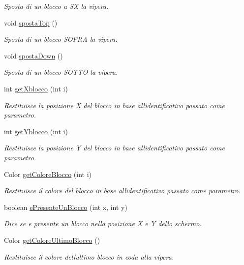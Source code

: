 \begin{DoxyCompactItemize}
\begin{DoxyCompactList}\small\item\em Sposta di un blocco a SX la vipera. \end{DoxyCompactList}\item 
void \mbox{\hyperlink{class_snake_1_1game_1_1vipera_1_1vipera_a43993392ddd2cba04e0df6312742f235}{sposta\+Top}} ()
\begin{DoxyCompactList}\small\item\em Sposta di un blocco S\+O\+P\+RA la vipera. \end{DoxyCompactList}\item 
void \mbox{\hyperlink{class_snake_1_1game_1_1vipera_1_1vipera_a00853f3bb0a1c94d5a67c763d29acd84}{sposta\+Down}} ()
\begin{DoxyCompactList}\small\item\em Sposta di un blocco S\+O\+T\+TO la vipera. \end{DoxyCompactList}\item 
int \mbox{\hyperlink{class_snake_1_1game_1_1vipera_1_1vipera_ac25c5b310cb26c05d5ea69485d1e155f}{get\+Xblocco}} (int i)
\begin{DoxyCompactList}\small\item\em Restituisce la posizione X del blocco in base all\textquotesingle{}identificativo passato come parametro. \end{DoxyCompactList}\item 
int \mbox{\hyperlink{class_snake_1_1game_1_1vipera_1_1vipera_a4fad016a4b1de9e17b7092abd420d962}{get\+Yblocco}} (int i)
\begin{DoxyCompactList}\small\item\em Restituisce la posizione Y del blocco in base all\textquotesingle{}identificativo passato come parametro. \end{DoxyCompactList}\item 
Color \mbox{\hyperlink{class_snake_1_1game_1_1vipera_1_1vipera_a6c5d6f8c561308ff9ec579b370a969e0}{get\+Colore\+Blocco}} (int i)
\begin{DoxyCompactList}\small\item\em Restituisce il colore del blocco in base all\textquotesingle{}identificativo passato come parametro. \end{DoxyCompactList}\item 
boolean \mbox{\hyperlink{class_snake_1_1game_1_1vipera_1_1vipera_ac24833a417b3bd7c60e29ed5b7edc29f}{e\+Presente\+Un\+Blocco}} (int x, int y)
\begin{DoxyCompactList}\small\item\em Dice se e\textquotesingle{} presente un blocco nella posizione X e Y dello schermo. \end{DoxyCompactList}\item 
Color \mbox{\hyperlink{class_snake_1_1game_1_1vipera_1_1vipera_a1afbc9b85396f53e6180eab2e5a36d4d}{get\+Colore\+Ultimo\+Blocco}} ()
\begin{DoxyCompactList}\small\item\em Restituisce il colore dell\textquotesingle{}ultimo blocco in coda alla vipera. \end{DoxyCompactList}\end{DoxyCompactItemize}
